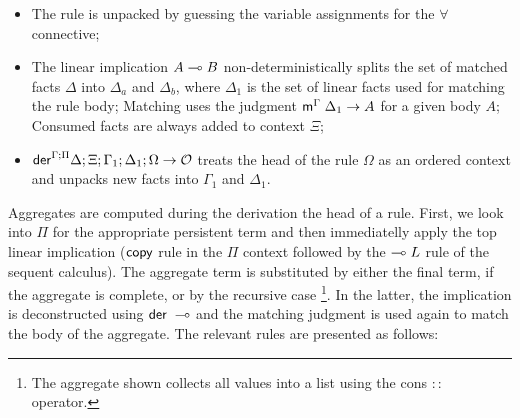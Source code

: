 \begin{itemize}[leftmargin=*]

   \item The rule is unpacked by guessing the variable assignments for the
      $\forall$ connective;

   \item The linear implication $A \multimap B$ non-deterministically splits the
   set of matched facts $\Delta$ into $\Delta_a$ and $\Delta_b$, where
   $\Delta_1$ is the set of linear facts used for matching the rule body;
   Matching uses the judgment $\mathsf{m}^{\Gamma} \; \Delta_1 \rightarrow A$ for a given
   body $A$; Consumed facts are always added to context $\Xi$;


   \item $\mathsf{der}^{\Gamma ; \Pi} \Delta ; \Xi; \Gamma_1; \Delta_1; \Omega \rightarrow \mathcal{O}$
      treats the head of the rule $\Omega$ as an ordered context and unpacks new
      facts into $\Gamma_1$ and $\Delta_1$.

\end{itemize}

Aggregates are computed during the derivation the head of a rule.  First, we
look into $\Pi$ for the appropriate persistent term and then immediatelly apply
the top linear implication ($\mathsf{copy}$ rule in the $\Pi$ context followed by the
$\multimap L$ rule of the sequent calculus). The aggregate term is substituted by
either the final term, if the aggregate is complete, or by the recursive case
\footnote{The aggregate shown collects all values into a list using the cons
$::$ operator.}. In the latter, the implication is deconstructed using $\mathsf{der} \;
\multimap$ and the matching judgment is used again to match the body of the
aggregate. The relevant rules are presented as follows:

